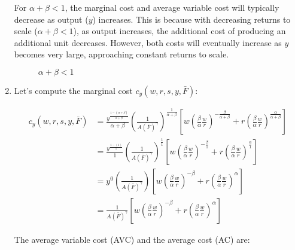 \documentclass[UTF8,titlepage]{article}
\numberwithin{figure}{section}
\begin{document}
\begin{enumerate}
For \(\alpha+\beta < 1\), the marginal cost and average variable cost will typically decrease as output (\(y\)) increases. This is because with decreasing returns to scale (\(\alpha+\beta < 1\)), as output increases, the additional cost of producing an additional unit decreases. However, both costs will eventually increase as \(y\) becomes very large, approaching constant returns to scale.

\begin{figure}[H]
\centering
 \caption{$\alpha +\beta <1$}
 \label{fig:4.2.5}
\end{figure}

\item Let's compute the marginal cost \(c_{y}(w, r, s, y, \bar{F})\):

$$
\begin{aligned}
c_{y}(w, r, s, y, \bar{F}) &= \frac{y^{\frac{1-(\alpha+\beta)}{\alpha+\beta}}}{\alpha+\beta}\left(\frac{1}{A(\bar{F})^{\gamma}}\right)^{\frac{1}{\alpha+\beta}}\left[w\left(\frac{\beta}{\alpha} \frac{w}{r}\right)^{-\frac{\beta}{\alpha+\beta}}+r\left(\frac{\beta}{\alpha} \frac{w}{r}\right)^{\frac{\alpha}{\alpha+\beta}}\right] \\
&= \frac{y^{\frac{1-(1)}{1}}}{1}\left(\frac{1}{A(\bar{F})^{\gamma}}\right)^{\frac{1}{1}}\left[w\left(\frac{\beta}{\alpha} \frac{w}{r}\right)^{-\frac{\beta}{1}}+r\left(\frac{\beta}{\alpha} \frac{w}{r}\right)^{\frac{\alpha}{1}}\right] \\
&= y^0\left(\frac{1}{A(\bar{F})^{\gamma}}\right)\left[w\left(\frac{\beta}{\alpha} \frac{w}{r}\right)^{-\beta}+r\left(\frac{\beta}{\alpha} \frac{w}{r}\right)^{\alpha}\right] \\
&= \frac{1}{A(\bar{F})^{\gamma}}\left[w\left(\frac{\beta}{\alpha} \frac{w}{r}\right)^{-\beta}+r\left(\frac{\beta}{\alpha} \frac{w}{r}\right)^{\alpha}\right]
\end{aligned}
$$

The average variable cost (AVC) and the average cost (AC) are:



\end{enumerate}
\end{document}

